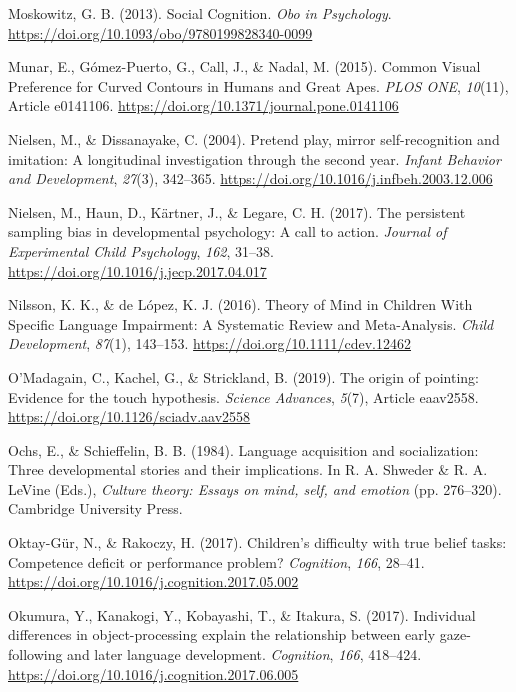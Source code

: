 \documentclass[
]{scrbook}
\newlength{\cslhangindent}
\newenvironment{CSLReferences}[2] %
 {\begin{list}{}{%
  \setlength{\itemindent}{0pt}
  \setlength{\leftmargin}{0pt}
  \setlength{\parsep}{0pt}
  \ifodd #1
   \setlength{\leftmargin}{\cslhangindent}
   \setlength{\itemindent}{-1\cslhangindent}
  \fi
  \setlength{\itemsep}{#2\baselineskip}}}
 {\end{list}}
\begin{document}
\begin{CSLReferences}{1}{0}
Moskowitz, G. B. (2013). Social {Cognition}. \emph{Obo in Psychology}. \url{https://doi.org/10.1093/obo/9780199828340-0099}

Munar, E., Gómez-Puerto, G., Call, J., \& Nadal, M. (2015). Common {Visual Preference} for {Curved Contours} in {Humans} and {Great Apes}. \emph{PLOS ONE}, \emph{10}(11), Article e0141106. \url{https://doi.org/10.1371/journal.pone.0141106}

Nielsen, M., \& Dissanayake, C. (2004). Pretend play, mirror self-recognition and imitation: A longitudinal investigation through the second year. \emph{Infant Behavior and Development}, \emph{27}(3), 342--365. \url{https://doi.org/10.1016/j.infbeh.2003.12.006}

Nielsen, M., Haun, D., Kärtner, J., \& Legare, C. H. (2017). The persistent sampling bias in developmental psychology: {A} call to action. \emph{Journal of Experimental Child Psychology}, \emph{162}, 31--38. \url{https://doi.org/10.1016/j.jecp.2017.04.017}

Nilsson, K. K., \& de López, K. J. (2016). Theory of {Mind} in {Children With Specific Language Impairment}: {A Systematic Review} and {Meta-Analysis}. \emph{Child Development}, \emph{87}(1), 143--153. \url{https://doi.org/10.1111/cdev.12462}

O'Madagain, C., Kachel, G., \& Strickland, B. (2019). The origin of pointing: {Evidence} for the touch hypothesis. \emph{Science Advances}, \emph{5}(7), Article eaav2558. \url{https://doi.org/10.1126/sciadv.aav2558}

Ochs, E., \& Schieffelin, B. B. (1984). Language acquisition and socialization: {Three} developmental stories and their implications. In R. A. Shweder \& R. A. LeVine (Eds.), \emph{Culture theory: {Essays} on mind, self, and emotion} (pp. 276--320). Cambridge University Press.

Oktay-Gür, N., \& Rakoczy, H. (2017). Children's difficulty with true belief tasks: {Competence} deficit or performance problem? \emph{Cognition}, \emph{166}, 28--41. \url{https://doi.org/10.1016/j.cognition.2017.05.002}

Okumura, Y., Kanakogi, Y., Kobayashi, T., \& Itakura, S. (2017). Individual differences in object-processing explain the relationship between early gaze-following and later language development. \emph{Cognition}, \emph{166}, 418--424. \url{https://doi.org/10.1016/j.cognition.2017.06.005}


\end{CSLReferences}
\end{document}
